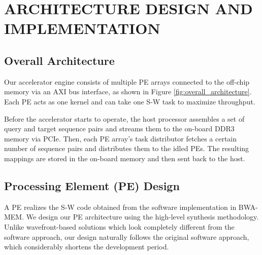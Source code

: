 \section{ARCHITECTURE DESIGN AND IMPLEMENTATION} 
\label{sec:architecture}
\subsection{Overall Architecture}

Our accelerator engine consists of multiple PE arrays connected to the off-chip memory via an AXI bus interface, as shown in Figure \ref{fig:overall_architecture}.
Each PE acts as one kernel and can take one S-W task to maximize throughput.

Before the accelerator starts to operate, the host processor assembles a set of query and target sequence pairs and streams them to the on-board DDR3 memory via PCIe. 
Then, each PE array's task distributor fetches a certain number of sequence pairs and distributes them to the idled PEs. 
The resulting mappings are stored in the on-board memory and then sent back to the host.
\subsection{Processing Element (PE) Design}
A PE realizes the S-W code obtained from the software implementation in BWA-MEM. 
We design our PE architecture using the high-level synthesis methodology. 
Unlike wavefront-based solutions which look completely different from the software approach,  
our design naturally follows the original software approach, which considerably shortens the development period. 

